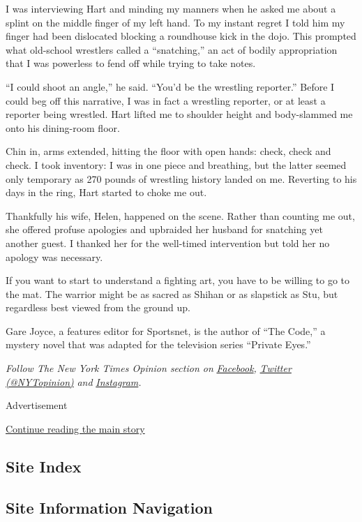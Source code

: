 I was interviewing Hart and minding my manners when he asked me about a
splint on the middle finger of my left hand. To my instant regret I told
him my finger had been dislocated blocking a roundhouse kick in the
dojo. This prompted what old-school wrestlers called a ``snatching,'' an
act of bodily appropriation that I was powerless to fend off while
trying to take notes.

``I could shoot an angle,'' he said. ``You'd be the wrestling
reporter.'' Before I could beg off this narrative, I was in fact a
wrestling reporter, or at least a reporter being wrestled. Hart lifted
me to shoulder height and body-slammed me onto his dining-room floor.

Chin in, arms extended, hitting the floor with open hands: check, check
and check. I took inventory: I was in one piece and breathing, but the
latter seemed only temporary as 270 pounds of wrestling history landed
on me. Reverting to his days in the ring, Hart started to choke me out.

Thankfully his wife, Helen, happened on the scene. Rather than counting
me out, she offered profuse apologies and upbraided her husband for
snatching yet another guest. I thanked her for the well-timed
intervention but told her no apology was necessary.

If you want to start to understand a fighting art, you have to be
willing to go to the mat. The warrior might be as sacred as Shihan or as
slapstick as Stu, but regardless best viewed from the ground up.

Gare Joyce, a features editor for Sportsnet, is the author of ``The
Code,'' a mystery novel that was adapted for the television series
``Private Eyes.''

\emph{Follow The New York Times Opinion section on}
\href{https://www.facebook.com/nytopinion}{\emph{Facebook}}\emph{,}
\href{http://twitter.com/NYTOpinion}{\emph{Twitter (@NYTopinion)}}
\emph{and}
\href{https://www.instagram.com/nytopinion/}{\emph{Instagram}}\emph{.}

Advertisement

\protect\hyperlink{after-bottom}{Continue reading the main story}

\hypertarget{site-index}{%
\subsection{Site Index}\label{site-index}}

\hypertarget{site-information-navigation}{%
\subsection{Site Information
Navigation}\label{site-information-navigation}}

